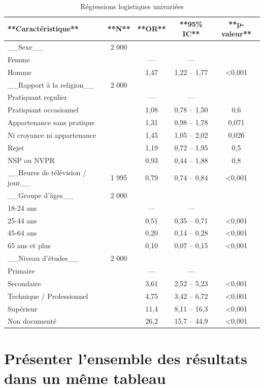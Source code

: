 \documentclass[
  letterpaper,
  DIV=11,
  numbers=noendperiod,
  oneside]{scrreprt}
\begin{document}
\hypertarget{tbl-uregression}{}
\begin{table}
\caption{\label{tbl-uregression}Régressions logistiques univariées }\tabularnewline

\centering
\begin{tabular}{l|c|c|c|c}
\hline
**Caractéristique** & **N** & **OR** & **95\% IC** & **p-valeur**\\
\hline
\_\_Sexe\_\_ & 2 000 &  &  & \\
\hline
Femme &  & — & — & \\
\hline
Homme &  & 1,47 & 1,22 – 1,77 & <0,001\\
\hline
\_\_Rapport à la religion\_\_ & 2 000 &  &  & \\
\hline
Pratiquant regulier &  & — & — & \\
\hline
Pratiquant occasionnel &  & 1,08 & 0,78 – 1,50 & 0,6\\
\hline
Appartenance sans pratique &  & 1,31 & 0,98 – 1,78 & 0,071\\
\hline
Ni croyance ni appartenance &  & 1,45 & 1,05 – 2,02 & 0,026\\
\hline
Rejet &  & 1,19 & 0,72 – 1,95 & 0,5\\
\hline
NSP ou NVPR &  & 0,93 & 0,44 – 1,88 & 0,8\\
\hline
\_\_Heures de télévision / jour\_\_ & 1 995 & 0,79 & 0,74 – 0,84 & <0,001\\
\hline
\_\_Groupe d'âges\_\_ & 2 000 &  &  & \\
\hline
18-24 ans &  & — & — & \\
\hline
25-44 ans &  & 0,51 & 0,35 – 0,71 & <0,001\\
\hline
45-64 ans &  & 0,20 & 0,14 – 0,28 & <0,001\\
\hline
65 ans et plus &  & 0,10 & 0,07 – 0,15 & <0,001\\
\hline
\_\_Niveau d'études\_\_ & 2 000 &  &  & \\
\hline
Primaire &  & — & — & \\
\hline
Secondaire &  & 3,61 & 2,52 – 5,23 & <0,001\\
\hline
Technique / Professionnel &  & 4,75 & 3,42 – 6,72 & <0,001\\
\hline
Supérieur &  & 11,4 & 8,11 – 16,3 & <0,001\\
\hline
Non documenté &  & 26,2 & 15,7 – 44,9 & <0,001\\
\hline
\end{tabular}
\end{table}

\hypertarget{pruxe9senter-lensemble-des-ruxe9sultats-dans-un-muxeame-tableau}{%
\section{Présenter l'ensemble des résultats dans un même
tableau}\label{pruxe9senter-lensemble-des-ruxe9sultats-dans-un-muxeame-tableau}}
\end{document}
